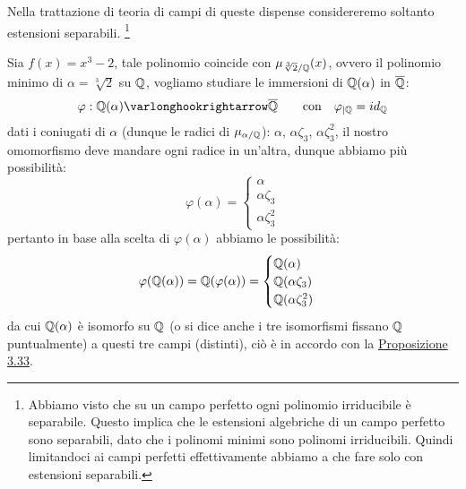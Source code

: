 \documentclass[11pt]{scrartcl}
\begin{document}
Nella trattazione di teoria di campi di queste dispense considereremo soltanto estensioni separabili.
\footnote{Abbiamo visto che su un campo perfetto ogni polinomio irriducibile è separabile.
Questo implica che le estensioni algebriche di un campo perfetto sono separabili, dato che i polinomi minimi sono polinomi irriducibili.
Quindi limitandoci ai campi perfetti effettivamente abbiamo a che fare solo con estensioni separabili.}

\begin{example}
    Sia $f(x) = x^3 - 2$, tale polinomio coincide con $\mu_{\sqrt[3]{2}/\mathbb Q}(x)$, ovvero il polinomio minimo di $\alpha = \sqrt[3]{2}$ su $\mathbb Q$, vogliamo studiare le immersioni di $\mathbb Q(\alpha)$ in $\overline {\mathbb Q}$:
    \[ \varphi : \QQ(\alpha) \varlonghookrightarrow \overline \QQ \qquad \text{con} \quad \varphi_{|\QQ} = id_\QQ
        \]
    dati i coniugati di $\alpha$ (dunque le radici di $\mu_{\alpha/\mathbb Q}$): $\alpha$, $\alpha\zeta_3$, $\alpha\zeta_3^2$, il nostro omomorfismo deve mandare ogni radice in un'altra, dunque abbiamo più possibilità:
    \[ \varphi(\alpha) = \begin{cases}
        \alpha \\
        \alpha\zeta_3 \\
         \alpha\zeta_3^2
        \end{cases}
        \]
    pertanto in base alla scelta di $\varphi(\alpha)$ abbiamo le possibilità:
    \[ \varphi(\mathbb Q(\alpha)) = \mathbb Q(\varphi(\alpha)) = \begin{cases}
        \mathbb Q(\alpha)\\
        \mathbb Q(\alpha\zeta_3)\\
        \mathbb Q(\alpha\zeta_3^2)\\
    \end{cases}
        \]
    da cui $\mathbb Q(\alpha)$ è isomorfo su $\mathbb Q$ (o si dice anche i tre isomorfismi fissano $\mathbb Q$ puntualmente) a questi tre campi (distinti), ciò è in accordo con la \hyperref[3.33]{Proposizione 3.33}.
\end{example}
\end{document}
